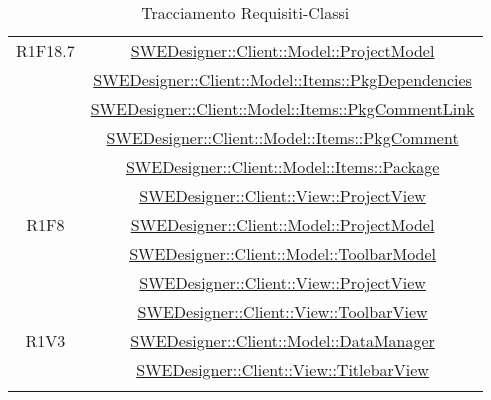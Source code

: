\documentclass[../DefinizioneDiProdotto.tex]{subfiles}
\begin{document}
\begin{longtable}{|c|c|}
				R1F18.7
				& \hyperlink{SWEDesigner::Client::Model::ProjectModel}{SWEDesigner::Client::Model::ProjectModel}\\
				& \hyperlink{SWEDesigner::Client::Model::Items::PkgDependencies}{SWEDesigner::Client::Model::Items::PkgDependencies}\\
				& \hyperlink{SWEDesigner::Client::Model::Items::PkgCommentLink}{SWEDesigner::Client::Model::Items::PkgCommentLink}\\
				& \hyperlink{SWEDesigner::Client::Model::Items::PkgComment}{SWEDesigner::Client::Model::Items::PkgComment}\\
				& \hyperlink{SWEDesigner::Client::Model::Items::Package}{SWEDesigner::Client::Model::Items::Package}\\
				& \hyperlink{SWEDesigner::Client::View::ProjectView}{SWEDesigner::Client::View::ProjectView}\\
				\hline

				R1F8
				& \hyperlink{SWEDesigner::Client::Model::ProjectModel}{SWEDesigner::Client::Model::ProjectModel}\\
				& \hyperlink{SWEDesigner::Client::Model::ToolbarModel}{SWEDesigner::Client::Model::ToolbarModel}\\
				& \hyperlink{SWEDesigner::Client::View::ProjectView}{SWEDesigner::Client::View::ProjectView}\\
				& \hyperlink{SWEDesigner::Client::View::ToolbarView}{SWEDesigner::Client::View::ToolbarView}\\
				\hline

				R1V3
				& \hyperlink{SWEDesigner::Client::Model::DataManager}{SWEDesigner::Client::Model::DataManager}\\
				& \hyperlink{SWEDesigner::Client::View::TitlebarView}{SWEDesigner::Client::View::TitlebarView}\\
				\hline

				\caption[Tracciamento Requisiti-Classi]{Tracciamento Requisiti-Classi}
				\label{tabella:requi-classi}
			\end{longtable}
			\clearpage
\end{document}
